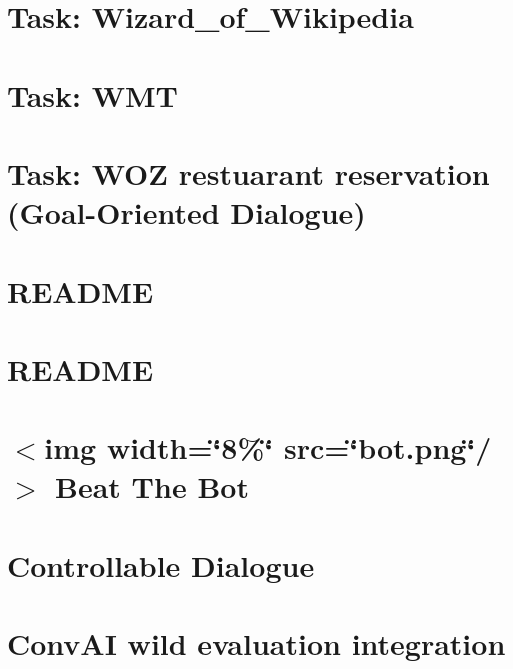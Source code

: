 \documentclass[twoside]{book}
\newcommand{\+}{\discretionary{\mbox{\scriptsize$\hookleftarrow$}}{}{}}
\begin{document}
\chapter{Task\+: Wizard\+\_\+of\+\_\+\+Wikipedia}
\label{md_parlai_tasks_wizard_of_wikipedia_README}

\chapter{Task\+: W\+MT}
\label{md_parlai_tasks_wmt_README}

\chapter{Task\+: W\+OZ restuarant reservation (Goal-\/\+Oriented Dialogue)}
\label{md_parlai_tasks_woz_README}

\chapter{R\+E\+A\+D\+ME}
\label{md_parlai_zoo_pretrained_transformers_README}

\chapter{R\+E\+A\+D\+ME}
\label{md_parlai_zoo_README}

\chapter{$<$img width=\char`\"{}8\%\char`\"{} src=\char`\"{}bot.\+png\char`\"{}/$>$ Beat The Bot}
\label{md_projects_beat_the_bot_README}

\chapter{Controllable Dialogue}
\label{md_projects_controllable_dialogue_README}

\chapter{Conv\+AI \textquotesingle{}wild\textquotesingle{} evaluation integration}
\label{md_projects_convai_README}

\end{document}
